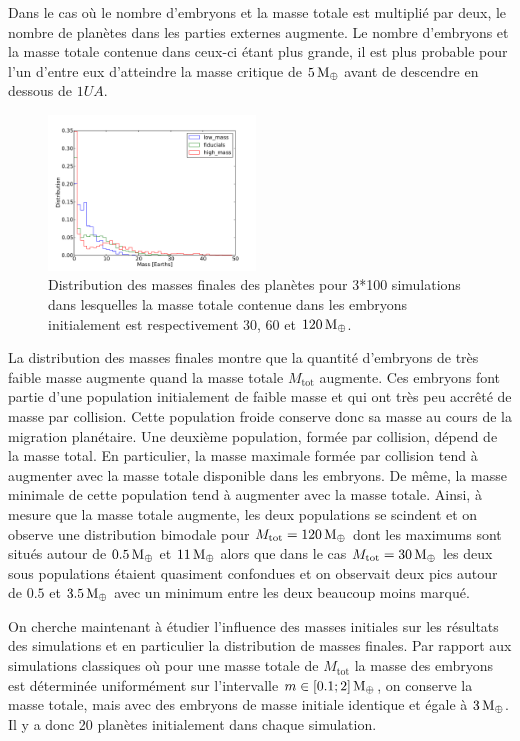 Dans le cas où le nombre d'embryons et la masse totale est multiplié par deux, le nombre de planètes dans les parties externes augmente. Le nombre d'embryons et la masse totale contenue dans ceux-ci étant plus grande, il est plus probable pour l'un d'entre eux d'atteindre la masse critique de $5\mathrm{\thinspace M_\oplus}$ avant de descendre en dessous de $1\unit{UA}$. 

\begin{figure}[htbp]
\centering
\includegraphics[width=0.49\textwidth]{figure/HSE/m_tot_hist_m.pdf}

\caption{Distribution des masses finales des planètes pour 3*100 simulations dans lesquelles la masse totale contenue dans les embryons initialement est respectivement $30$, $60$ et $120\mathrm{\thinspace M_\oplus}$.}\label{fig:HSE_m_tot_hist_m}
\end{figure}

La distribution des masses finales  montre que la quantité d'embryons de très faible masse augmente quand la masse totale $M_\text{tot}$ augmente. Ces embryons font partie d'une population initialement de faible masse et qui ont très peu accrêté de masse par collision. Cette population froide conserve donc sa masse au cours de la migration planétaire. Une deuxième population, formée par collision, dépend de la masse total. En particulier, la masse maximale formée par collision tend à augmenter avec la masse totale disponible dans les embryons. De même, la masse minimale de cette population tend à augmenter avec la masse totale. Ainsi, à mesure que la masse totale augmente, les deux populations se scindent et on observe une distribution bimodale pour $M_\text{tot}=120\mathrm{\thinspace M_\oplus}$ dont les maximums sont situés autour de $0.5\mathrm{\thinspace M_\oplus}$ et $11\mathrm{\thinspace M_\oplus}$ alors que dans le cas $M_\text{tot}=30\mathrm{\thinspace M_\oplus}$ les deux sous populations étaient quasiment confondues et on observait deux pics autour de $0.5$ et $3.5\mathrm{\thinspace M_\oplus}$ avec un minimum entre les deux beaucoup moins marqué.

\bigskip

On cherche maintenant à étudier l'influence des masses initiales sur les résultats des simulations et en particulier la distribution de masses finales. Par rapport aux simulations classiques où pour une masse totale de $M_\text{tot}$ la masse des embryons est déterminée uniformément sur l'intervalle $m\in[0.1 ; 2]\mathrm{\thinspace M_\oplus}$, on conserve la masse totale, mais avec des embryons de masse initiale identique et égale à $3\mathrm{\thinspace M_\oplus}$. Il y a donc 20 planètes initialement dans chaque simulation. 

